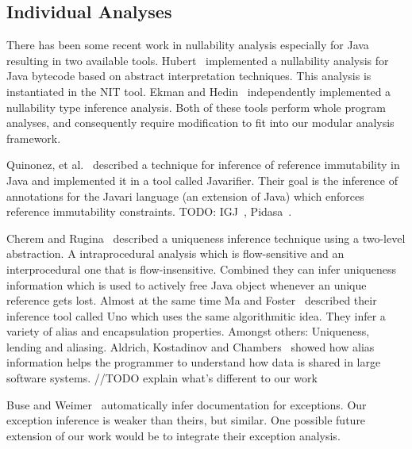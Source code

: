 \subsection{Individual Analyses}

There has been some recent work in nullability analysis especially for Java resulting in two available tools.  Hubert~\cite{NIT} implemented a nullability analysis for Java bytecode based on abstract interpretation techniques.  This analysis is instantiated in the {\sc NIT} tool.  Ekman and Hedin~\cite{NonNullTypeInference} independently implemented a nullability type inference analysis.  Both of these tools perform whole program analyses, and consequently require modification to fit into our modular analysis framework.

Quinonez, et al.~\cite{Javarifier} described a technique for inference of
reference immutability in Java and implemented it in a tool called {\sc
  Javarifier}. Their goal is the inference of annotations for the {\sc Javari}
language (an extension of Java) which enforces reference immutability
constraints. TODO: IGJ~\cite{IGJ}, Pidasa~\cite{Pidasa}.

Cherem and Rugina~\cite{UniquenessInference} described a uniqueness inference technique using a two-level
abstraction. A intraprocedural analysis which is flow-sensitive and an interprocedural
one that is flow-insensitive. Combined they can infer uniqueness information
which is used to actively free Java object whenever an unique reference gets lost.
Almost at the same time Ma and Foster~\cite{Uno} described their inference tool called
Uno which uses the same algorithmitic idea. They infer a variety of alias and encapsulation
properties. Amongst others: Uniqueness, lending and aliasing.
Aldrich, Kostadinov and Chambers~\cite{AliasJava} showed how alias information 
helps the programmer to understand how data is shared in large software systems.
//TODO explain what's different to our work

Buse and Weimer~\cite{autodoc} automatically infer documentation for
exceptions.  Our exception inference is weaker than theirs, but similar.  One
possible future extension of our work would be to integrate their exception
analysis.
